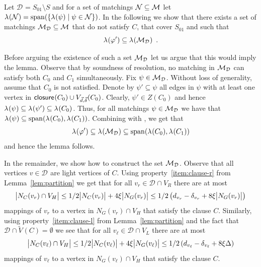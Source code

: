 \documentclass{article}
\providecommand{\Abs}[1]{\bigl\lvert#1\bigr\rvert}
\newcommand{\set}[1]{\{ #1 \}}
\newcommand{\setdescr}[3][\mid]{\set{ #2 #1 #3 }}
\newcommand{\Setsize}[1]{\bigl\lvert#1\bigr\rvert}
\newcommand{\eqperiod}{\enspace .}
\newcommand{\reflem}[1]{Lemma~\ref{#1}}
\newcommand{\light}{light\xspace}
\newcommand{\neigh}[2][]{N_{{#1}}(#2)}
\newcommand{\diff}{\xi}
\newcommand{\GdegMax}{\Delta}
\newcommand{\gdegmax}{\GdegMax}
\newcommand{\V}[1][]{V_{#1}}
\newcommand{\Vl}{\V[L]}
\newcommand{\Vr}{\V[R]}
\newcommand{\Vh}{\V[H]}
\newcommand{\Vbad}[2][]{\widetilde V^{#1}(#2)}
\newcommand{\thr}[1]{ \ensuremath d_{{#1}} }
\newcommand{\vecthr}{\vec{d}}
\newcommand{\adv}[1]{\delta_{{#1}}}
\newcommand{\vecadv}{\vec{\delta}}
\newcommand{\linmap}[1][]{\ensuremath \lambda_{{#1}}}
\newcommand{\linmapof}[2][]{\linmap[#1](#2)}
\newcommand{\Vthick}[1]{\ensuremath V_{\vecthr,\vecadv}(#1)}
\newcommand{\closure}[2][]{\mathsf{closure}_{{#1}}(#2)}
\newcommand{\diffclosure}[1][]{D_{{#1}}}
\renewcommand{\diffclosure}[1][]{\mathcal{D}_{{#1}}}
\newcommand{\matchb}{\varphi'}
\newcommand{\matchc}{\psi}
\newcommand{\matchd}{\psi'}
\newcommand{\matchings}[1][]{\ensuremath \mathcal{M}_{{#1}}}
\newcommand{\spans}[1]{\mathrm{span} ( #1 )}
\numberwithin{equation}{section}
\begin{document}
  Let $\diffclosure = S_{01} \setminus S$ and for a set of matchings
  $\mathcal{N} \subseteq \matchings$ let 
  $\linmapof{ \mathcal{N} } = 
  \spans{ \setdescr{ \linmapof{\matchc} }
  { \matchc \in \mathcal{N} } } $.
  In the following we show that there exists a set of matchings
  $\matchings[\diffclosure] \subseteq \matchings$ 
  that do not satisfy $C$, that cover $S_{01}$
  and such that
  \begin{equation} \label{eq:good_set}
    \linmapof{\matchb} \subseteq 
    \linmapof{ \matchings[\diffclosure] } \eqperiod
  \end{equation}

  Before arguing the existence of such a set
  $\matchings[\diffclosure]$ let us
  argue that this would imply the lemma.
  Observe that by soundness of resolution,
  no matching in $\matchings[\diffclosure]$ can satisfy 
  both $C_0$ and $C_1$ simultaneously. Fix $\matchc \in \matchings[\diffclosure]$. Without
  loss of generality, assume that $C_0$ is not satisfied. Denote
  by $\matchd \subseteq \matchc$ all edges in $\matchc$ with at least one
  vertex in 
  $\closure{C_0} \cup \Vthick{C_0}$. Clearly, $\matchd \in Z(C_0)$ and hence
  $\linmapof{\matchc} \subseteq \linmapof{\matchd} \subseteq \linmapof{C_0}$.
  Thus, for all matchings $\matchc \in \matchings[\diffclosure]$ we have that
  $\linmapof{\matchc} \subseteq \spans{\linmapof{C_0}, \linmapof{C_1} }$.
  Combining with , we get that
  \begin{equation}
    \linmapof{\matchb} \subseteq \linmapof{ \matchings[\diffclosure] } \subseteq 
    \spans{\linmapof{C_0}, \linmapof{C_1} }
  \end{equation}
  and hence the lemma follows.

  In the remainder, we show how to construct the set $\matchings[\diffclosure]$.
  Observe that all vertices $v \in \diffclosure$ are \light vertices of $C$. 
  Using property~\ref{item:clause-r}
  from \reflem{lem:partition} we get that for all $v_r \in \diffclosure \cap \Vr$
  there are at most
  \begin{equation}\label{eq:satC-r}
    	\Setsize{\neigh[C]{v_r} \cap \Vh } 
    	\le 1/2 
    	\Abs{ \neigh[C]{v_r} } + 4 \diff  \Abs{ \neigh[G]{v_r} }
    	\le 1/2 \left(\thr{v_r} - \adv{v_r} + 
    	8 \diff  \Abs{ \neigh[G]{v_r} } \right)
  \end{equation}
  mappings of $v_r$ to a vertex in $\neigh[G]{v_r} \cap \Vh$ 
  that satisfy the clause $C$.
  Similarly, using property~\ref{item:clause-l} from \reflem{lem:partition}
  and the fact that $\diffclosure \cap \Vbad{C} = \emptyset$
  we see that
  for all $v_\ell \in \diffclosure \cap \Vl$
  there are at most
  \begin{equation}\label{eq:satC-l}
        \Setsize{\neigh[C]{v_\ell} \cap \Vh } 
    	\le 1/2 
    	\Abs{ \neigh[C]{v_\ell} } + 4 \diff  \Abs{ \neigh[G]{v_\ell} }
    	\le 1/2 \left(\thr{v_\ell} - \adv{v_\ell} + 
    	8 \diff \gdegmax \right)
  \end{equation}
  mappings of $v_\ell$ to a vertex in $\neigh[G]{v_\ell} \cap \Vh$ 
  that satisfy the clause $C$.
  
\end{document}
